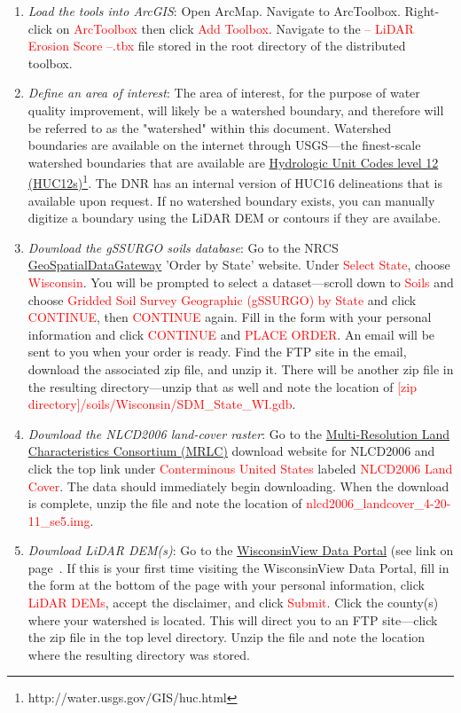 \documentclass{article}
\newcommand{\toolPar}[1]{\textcolor{red}{#1}}
\begin{document}
	\begin{enumerate}
		\item \emph{Load the tools into ArcGIS}: Open ArcMap. Navigate to ArcToolbox. Right-click on \toolPar{ArcToolbox} then click \toolPar{Add Toolbox}. Navigate to the \toolPar{-- LiDAR Erosion Score --.tbx} file stored in the root directory of the distributed toolbox.
		\item \emph{Define an area of interest}: The area of interest, for the purpose of water quality improvement, will likely be a watershed boundary, and therefore will be referred to as the "watershed" within this document. Watershed boundaries are available on the internet through USGS---the finest-scale watershed boundaries that are available are \href{http://water.usgs.gov/GIS/huc.html}{Hydrologic Unit Codes level 12 (HUC12s)}\footnote{http://water.usgs.gov/GIS/huc.html}. The DNR has an internal version of HUC16 delineations that is available upon request. If no watershed boundary exists, you can manually digitize a boundary using the LiDAR DEM or contours if they are availabe.
		\item \emph{Download the gSSURGO soils database}: Go to the NRCS \href{http://datagateway.nrcs.usda.gov/GDGOrder.aspx?order=QuickState}{GeoSpatialDataGateway} 'Order by State' website. Under \toolPar{Select State}, choose \toolPar{Wisconsin}. You will be prompted to select a dataset---scroll down to \toolPar{Soils} and choose \toolPar{Gridded Soil Survey Geographic (gSSURGO) by State} and click \toolPar{CONTINUE}, then \toolPar{CONTINUE} again. Fill in the form with your personal information and click \toolPar{CONTINUE} and \toolPar{PLACE ORDER}. An email will be sent to you when your order is ready. Find the FTP site in the email, download the associated zip file, and unzip it. There will be another zip file in the resulting directory---unzip that as well and note the location of \toolPar{[zip directory]/soils/Wisconsin/SDM\_State\_WI.gdb}.
		\item \emph{Download the NLCD2006 land-cover raster}: Go to the \href{http://www.mrlc.gov/nlcd06_data.php}{Multi-Resolution Land Characteristics Consortium (MRLC)} download website for NLCD2006 and click the top link under \toolPar{Conterminous United States} labeled \toolPar{NLCD2006 Land Cover}. The data should immediately begin downloading. When the download is complete, unzip the file and note the location of \toolPar{nlcd2006\_landcover\_4-20-11\_se5.img}.
		\item \emph{Download LiDAR DEM(s)}: Go to the \href{http://relief.ersc.wisc.edu/wisconsinview/form.php}{WisconsinView Data Portal} (see link on page~\pageref{wisconsinViewWebsite}. If this is your first time visiting the WisconsinView Data Portal, fill in the form at the bottom of the page with your personal information, click \toolPar{LiDAR DEMs}, accept the disclaimer, and click \toolPar{Submit}. Click the county(s) where your watershed is located. This will direct you to an FTP site---click the zip file in the top level directory. Unzip the file and note the location where the resulting directory was stored.
	\end{enumerate}
\end{document}
